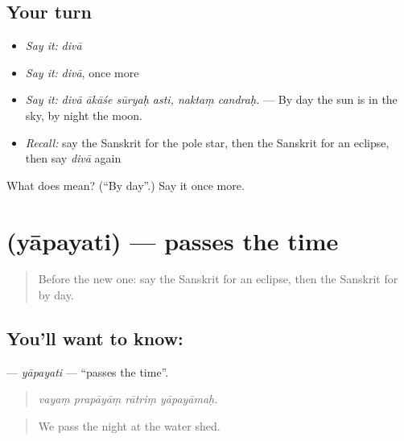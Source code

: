 \subsection*{Your turn}
\begin{itemize}
\raggedright
  \item \emph{Say it:} \emph{divā}
  \item \emph{Say it:} \emph{divā}, once more
  \item \emph{Say it:} \emph{divā ākāśe sūryaḥ asti, naktaṃ candraḥ.} — By day the sun is in the sky, by night the moon.
  \item \emph{Recall:} say the Sanskrit for the pole star, then the Sanskrit for an eclipse, then say \emph{divā} again
\end{itemize}

\begin{tcolorbox}[breakable,colback=teal!4,colframe=teal!35!black,title={Before you move on}]
What does  mean? (\textquotedblleft{}By day\textquotedblright{}.) Say it once more.
\end{tcolorbox}
\section[\texorpdfstring{\sk{यापयति} (yāpayati)}{यापयति (yāpayati)}]{ (yāpayati) — passes the time}

\label{lesson:SA-C445-yapayati}



\begin{quote}
Before the new one: say the Sanskrit for an eclipse, then the Sanskrit for by day.
\end{quote}

\subsection*{You'll want to know: }
\textbf{} — \emph{yāpayati} — \textquotedblleft{}passes the time\textquotedblright{}.

\begin{quote}
   
\end{quote}

\begin{quote}
\emph{vayaṃ prapāyāṃ rātriṃ yāpayāmaḥ.}
\end{quote}

\begin{quote}
We pass the night at the water shed.
\end{quote}

